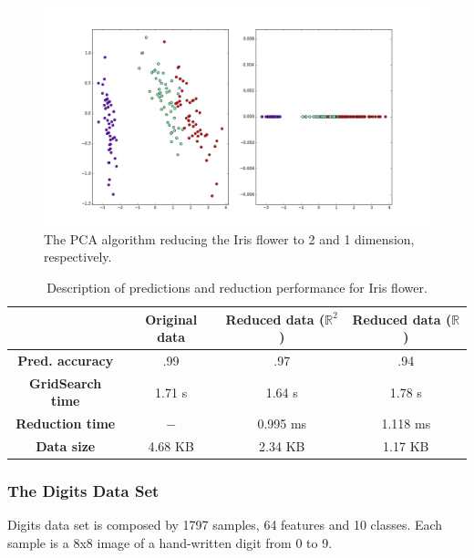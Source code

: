 \documentclass[12pt]{article}
\begin{document}
\begin{figure}[H]
	\centering
	\captionsetup{justification=centering}

	\includegraphics[width=\linewidth]{dsirispca}
	\caption{The PCA algorithm reducing the Iris flower to 2 and 1 dimension, respectively.}
	\label{fig:dsirispca}
\end{figure}

\begin{table}[H]
	\centering

	\begin{tabular}{|c|c|c|c|}
		\hline
		& \textbf{Original data} & \textbf{Reduced data ($\mathbb{R}^2$)} & \textbf{Reduced data ($\mathbb{R}$)} \\\hline
		\textbf{Pred. accuracy} & .99 & .97 & .94 \\\hline
		\textbf{GridSearch time} & 1.71 s & 1.64 s & 1.78 s \\\hline
		\textbf{Reduction time} & $-$ & 0.995 ms & 1.118 ms \\\hline
		\textbf{Data size} & 4.68 KB & 2.34 KB & 1.17 KB \\\hline
	\end{tabular}

	\caption{Description of predictions and reduction performance for Iris flower.}
\end{table}

\subsubsection{The Digits Data Set}

Digits data set is composed by 1797 samples, 64 features and 10 classes. Each sample is a 8x8 image of a hand-written digit from 0 to 9.
\end{document}
